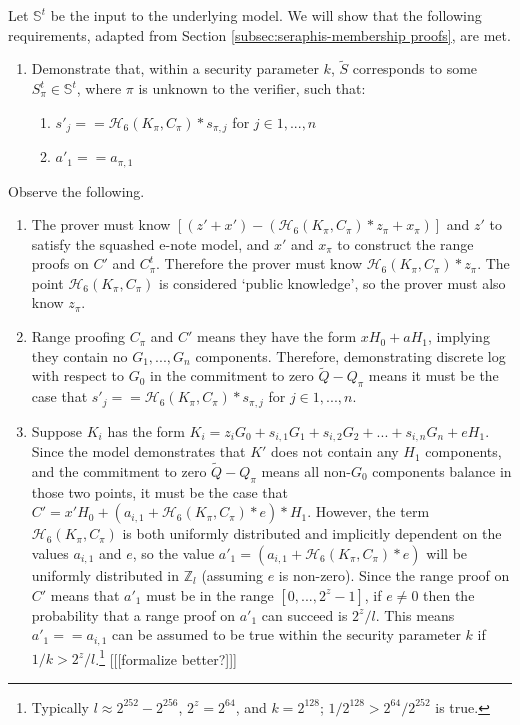\begin{appendices}
Let $\mathbb{S}^t$ be the input to the underlying model. We will show that the following requirements, adapted from Section \ref{subsec:seraphis-membership proofs}, are met.

\begin{enumerate}
    \item Demonstrate that, within a security parameter $k$, $\tilde{S}$ corresponds to some $S^t_{\pi} \in \mathbb{S}^t$, where $\pi$ is unknown to the verifier, such that:
    \begin{enumerate}
        \item $s'_j == \mathcal{H}_6(K_{\pi}, C_{\pi})*s_{\pi,j}$ for $j \in 1,...,n$
        \item $a'_1 == a_{\pi,1}$
    \end{enumerate}
\end{enumerate}

Observe the following.

\begin{enumerate}
    \item The prover must know $[(z' + x') - (\mathcal{H}_6(K_{\pi}, C_{\pi})*z_{\pi} + x_{\pi})]$ and $z'$ to satisfy the squashed e-note model, and $x'$ and $x_{\pi}$ to construct the range proofs on $C'$ and $C^t_{\pi}$. Therefore the prover must know $\mathcal{H}_6(K_{\pi}, C_{\pi})*z_{\pi}$. The point $\mathcal{H}_6(K_{\pi}, C_{\pi})$ is considered `public knowledge', so the prover must also know $z_{\pi}$.

    \item Range proofing $C_{\pi}$ and $C'$ means they have the form $x H_0 + a H_1$, implying they contain no $G_1,...,G_n$ components. Therefore, demonstrating discrete log with respect to $G_0$ in the commitment to zero $\tilde{Q} - Q_{\pi}$ means it must be the case that $s'_j == \mathcal{H}_6(K_{\pi}, C_{\pi})*s_{\pi,j}$ for $j \in 1,...,n$.

    \item Suppose $K_i$ has the form $K_i = z_i G_0 + s_{i,1} G_1 + s_{i,2} G_2 + ... + s_{i,n} G_n + e H_1$. Since the model demonstrates that $K'$ does not contain any $H_1$ components, and the commitment to zero $\tilde{Q} - Q_{\pi}$ means all non-$G_0$ components balance in those two points, it must be the case that $C' = x' H_0 + (a_{i,1} + \mathcal{H}_6(K_{\pi}, C_{\pi})*e)*H_1$. However, the term $\mathcal{H}_6(K_{\pi}, C_{\pi})$ is both uniformly distributed and implicitly dependent on the values $a_{i,1}$ and $e$, so the value $a'_1 = (a_{i,1} + \mathcal{H}_6(K_{\pi}, C_{\pi})*e)$ will be uniformly distributed in $\mathbb{Z}_l$ (assuming $e$ is non-zero). Since the range proof on $C'$ means that $a'_1$ must be in the range $[0,...,2^z - 1]$, if $e \neq 0$ then the probability that a range proof on $a'_1$ can succeed is $2^z/l$. This means $a'_1 == a_{i,1}$ can be assumed to be true within the security parameter $k$ if $1/k > 2^z/l$.\footnote{Typically $l \approx 2^{252} - 2^{256}$, $2^z = 2^{64}$, and $k = 2^{128}$; $1/2^{128} > 2^{64}/2^{252}$ is true.} [[[formalize better?]]]
\end{enumerate}


\end{appendices}
